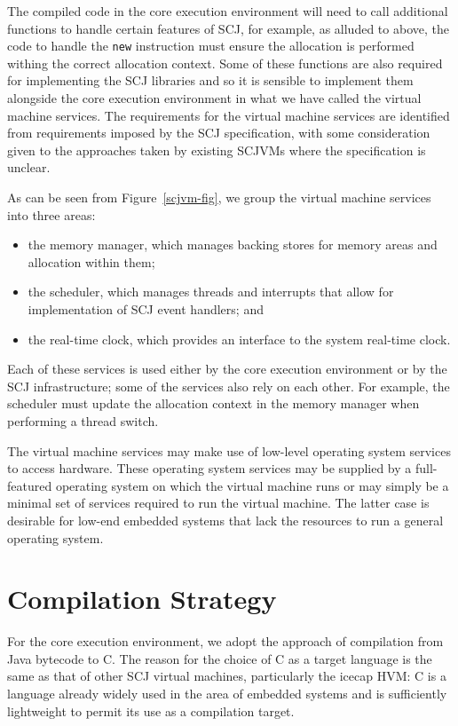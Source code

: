 \documentclass[a4paper,10pt]{report}
\begin{document}
The compiled code in the core execution environment will need to call additional
functions to handle certain features of SCJ, for example, as alluded to above,
the code to handle the \texttt{new} instruction must ensure the allocation is
performed withing the correct allocation context.  Some of these functions are
also required for implementing the SCJ libraries and so it is sensible to
implement them alongside the core execution environment in what we have called
the virtual machine services.  The requirements for the virtual machine services
are identified from requirements imposed by the SCJ specification, with some
consideration given to the approaches taken by existing SCJVMs where the
specification is unclear.

As can be seen from Figure~\ref{scjvm-fig}, we group the virtual
machine services into three areas:
\begin{itemize}
\item the memory manager, which manages backing stores for memory areas and
  allocation within them;
\item the scheduler, which manages threads and interrupts that allow for
  implementation of SCJ event handlers; and
\item the real-time clock, which provides an interface to the system real-time
  clock.
\end{itemize}
Each of these services is used either by the core execution environment or by
the SCJ infrastructure; some of the services also rely on each other.  For
example, the scheduler must update the allocation context in the memory manager
when performing a thread switch.

The virtual machine services may make use of low-level operating system
services to access hardware.  These operating system services may be supplied by
a full-featured operating system on which the virtual machine runs or may simply
be a minimal set of services required to run the virtual machine.  The latter
case is desirable for low-end embedded systems that lack the resources to
run a general operating system.

\section{Compilation Strategy}

For the core execution environment, we adopt the approach of
compilation from Java bytecode to C. The reason for the choice of C as
a target language is the same as that of other SCJ virtual machines,
particularly the icecap HVM: C is a language already widely used in
the area of embedded systems and is sufficiently lightweight to permit
its use as a compilation target.
\end{document}
